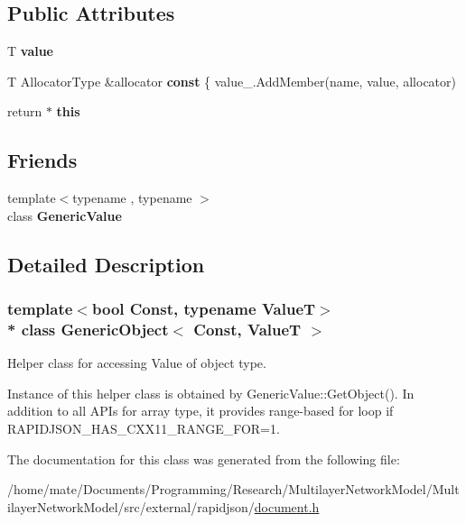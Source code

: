 \subsection*{Public Attributes}
\begin{DoxyCompactItemize}
\item 
T {\bfseries value}\hypertarget{classGenericObject_a131538fbbacbc0a3a5ad15dbea66394f}{}\label{classGenericObject_a131538fbbacbc0a3a5ad15dbea66394f}

\item 
T Allocator\+Type \&allocator {\bfseries const} \{ value\+\_\+.\+Add\+Member(name, value, allocator)\hypertarget{classGenericObject_af70c9646b5e422306c33e98b3d8783a7}{}\label{classGenericObject_af70c9646b5e422306c33e98b3d8783a7}

\item 
return $\ast$ {\bfseries this}\hypertarget{classGenericObject_a719a0e5501da825e6f86ce12b46446cb}{}\label{classGenericObject_a719a0e5501da825e6f86ce12b46446cb}

\end{DoxyCompactItemize}
\subsection*{Friends}
\begin{DoxyCompactItemize}
\item 
{\footnotesize template$<$typename , typename $>$ }\\class {\bfseries Generic\+Value}\hypertarget{classGenericObject_a899449e1a645b5e377af059fb61113d8}{}\label{classGenericObject_a899449e1a645b5e377af059fb61113d8}

\end{DoxyCompactItemize}


\subsection{Detailed Description}
\subsubsection*{template$<$bool Const, typename ValueT$>$\\*
class Generic\+Object$<$ Const, Value\+T $>$}

Helper class for accessing Value of object type. 

Instance of this helper class is obtained by {\ttfamily Generic\+Value\+::\+Get\+Object()}. In addition to all A\+P\+Is for array type, it provides range-\/based for loop if {\ttfamily R\+A\+P\+I\+D\+J\+S\+O\+N\+\_\+\+H\+A\+S\+\_\+\+C\+X\+X11\+\_\+\+R\+A\+N\+G\+E\+\_\+\+F\+OR=1}. 

The documentation for this class was generated from the following file\+:\begin{DoxyCompactItemize}
\item 
/home/mate/\+Documents/\+Programming/\+Research/\+Multilayer\+Network\+Model/\+Multilayer\+Network\+Model/src/external/rapidjson/\hyperlink{document_8h}{document.\+h}\end{DoxyCompactItemize}

